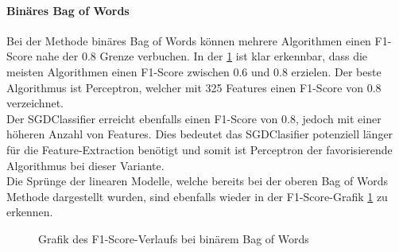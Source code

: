 \paragraph{Binäres Bag of Words}
Bei der Methode \glqq binäres Bag of Words\grqq{} können mehrere Algorithmen einen F1-Score nahe der 0.8 Grenze verbuchen.
In der \cref{abb:bow-bin-f1} ist klar erkennbar, dass die meisten Algorithmen einen F1-Score zwischen 0.6 und 0.8 erzielen.
Der beste Algorithmus ist Perceptron, welcher mit 325 Features einen F1-Score von 0.8 verzeichnet.\\
Der SGDClassifier erreicht ebenfalls einen F1-Score von 0.8, jedoch mit einer höheren Anzahl von Features.
Dies bedeutet das SGDClasifier potenziell länger für die Feature-Extraction benötigt und somit ist Perceptron der favorisierende Algorithmus bei dieser Variante.\\
Die Sprünge der linearen Modelle, welche bereits bei der oberen \glqq Bag of Words\grqq{} Methode dargestellt wurden, sind ebenfalls wieder in der F1-Score-Grafik \cref{abb:bow-bin-f1} zu erkennen.
\begin{figure}[H]	
	\setlength{\fboxsep}{0.3pt} 
	\setlength{\fboxrule}{0.3pt} 
	\caption{Grafik des F1-Score-Verlaufs bei binärem Bag of Words}
	\label{abb:bow-bin-f1}
\end{figure}
